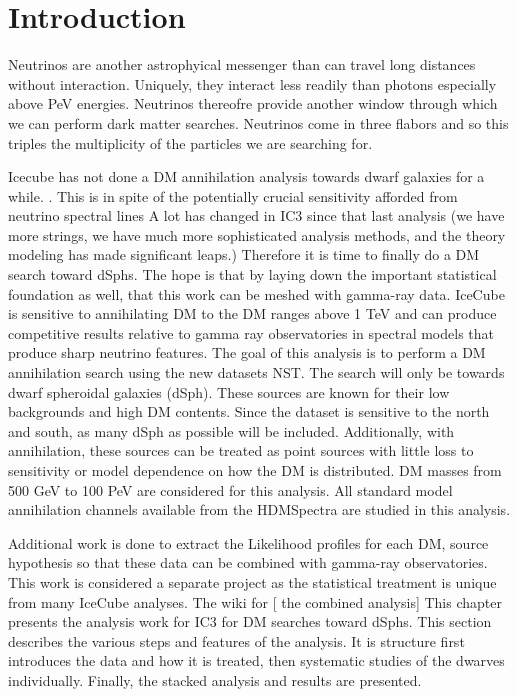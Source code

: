 \section{Introduction} \label{sec:icDM_intro}

Neutrinos are another astrophyical messenger than can travel long distances without interaction.
Uniquely, they interact less readily than photons especially above PeV energies.
Neutrinos thereofre provide another window through which we can perform dark matter searches.
Neutrinos come in three flabors and so this triples the multiplicity of the particles we are searching for.

Icecube has not done a DM annihilation analysis towards dwarf galaxies for a while. .
This is in spite of the potentially crucial sensitivity afforded from neutrino spectral lines 
A lot has changed in IC3 since that last analysis (we have more strings, we have much more sophisticated analysis methods, and the theory modeling has made significant leaps.)
Therefore it is time to finally do a DM search toward dSphs.
The hope is that by laying down the important statistical foundation as well, that this work can be meshed with gamma-ray data.
IceCube is sensitive to annihilating DM to the DM ranges above 1 TeV and can produce competitive results relative to gamma ray observatories in spectral models that produce sharp neutrino features.
The goal of this analysis is to perform a DM annihilation search using the new datasets NST.
The search will only be towards dwarf spheroidal galaxies (dSph).
These sources are known for their low backgrounds and high DM contents.
Since the dataset is sensitive to the north and south, as many dSph as possible will be included.
Additionally, with annihilation, these sources can be treated as point sources with little loss to sensitivity or model dependence on how the DM is distributed.
DM masses from 500 GeV to 100 PeV are considered for this analysis.
All standard model annihilation channels available from the HDMSpectra are studied in this analysis.

Additional work is done to extract the Likelihood profiles for each DM, source hypothesis so that these data can be combined with gamma-ray observatories.
This work is considered a separate project as the statistical treatment is unique from many IceCube analyses.
The wiki for [ the combined analysis] 
This chapter presents the analysis work for IC3 for DM searches toward dSphs.
This section describes the various steps and features of the analysis.
It is structure first introduces the data and how it is treated, then systematic studies of the dwarves individually. Finally, the stacked analysis and results are presented.

